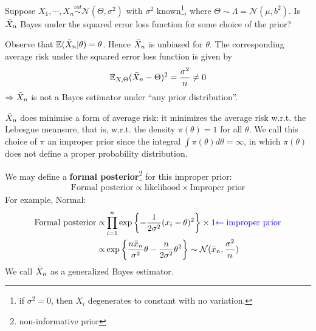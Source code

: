 \begin{example}
    Suppose $X_1,\cdots,X_n\overset{iid}{\sim}\mathcal{N}(\Theta,\sigma^2)$ with $\sigma^2$ known\footnote{
    if $\sigma^2=0$, then $X_i$ degenerates to constant with no variation.},
    where $\Theta\sim\Lambda=\mathcal{N}(\mu,b^2)$.
    Is $\Bar{X}_n$ Bayes under the squared error loss function for some choice of the prior?

    Observe that $\mathbb{E}(\Bar{X}_n|\theta)=\theta$.
    Hence $\Bar{X}_n$ is unbiased for $\theta$.
    The corresponding average risk under the squared error loss function is given by
    \begin{gather}
        \mathbb{E}_{X,\Theta}(\Bar{X}_n-\Theta)^2=\frac{\sigma^2}{n}\neq{0}
    \end{gather}
    $\Rightarrow{\Bar{X}_n}$ is not a Bayes estimator under ``any prior distribution''.
\end{example}

\begin{note}
    $\Bar{X}_n$ does minimise a form of average risk: it minimizes the average risk w.r.t. the Lebesgue meansure,
    that is, w.r.t. the density $\pi(\theta)=1$ for all $\theta$.
    We call this choice of $\pi$ an improper prior since the integral $\int{\pi(\theta)}d\theta=\infty$,
    in which $\pi(\theta)$ does not define a proper probability distribution.

    We may define a \textbf{formal posterior}\footnote{non-informative prior} for this improper prior:
    \begin{gather}
        \text{Formal posterior}
        \propto \text{likelihood}\times\text{Improper prior}
    \end{gather}
    For example, Normal:
    \begin{align}
        \text{Formal posterior}
        \propto& \prod_{i=1}^n\exp\left\{
            -\frac{1}{2\sigma^2}(x_i-\theta)^2
        \right\}\times{1}{\color{blue} \leftarrow \text{improper prior}}\\
        \propto& \exp\left\{
            \frac{n\Bar{x}_n}{\sigma^2}\theta - \frac{n}{2\sigma^2}\theta^2
        \right\}
        \sim \mathcal{N}(\Bar{x}_n,\frac{\sigma^2}{n})
    \end{align}
    We call $\Bar{X}_n$ as a generalized Bayes estimator.
\end{note}

